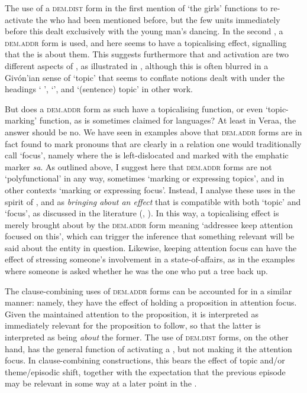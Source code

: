\documentclass[output=paper
,modfonts
,nonflat]{langsci/langscibook}
\begin{document}
\noindent
The use of a \textsc{dem.dist} form in the first mention of `the girls' functions to re-activate the  who had been mentioned before, but the few  units immediately before this dealt exclusively with the young man's dancing. In the second , a \textsc{dem.addr} form is used, and here seems to have a topicalising effect, signalling that the  is about them. This suggests furthermore that  and  activation are two different aspects of , as illustrated in \cite[Chapter~2]{Vallduvi1993} , although this is often blurred in a Giv\'{o}n'ian sense of `topic' that seems to conflate notions dealt with under the headings ` ', `', and `(sentence) topic' in other work.

But does a \textsc{dem.addr} form as such have a topicalising function, or even `topic-marking' function, as is sometimes claimed for  languages? At least in Vera{\textquotesingle}a, the answer should be no. We have seen in examples above that \textsc{dem.addr} forms are in fact found to mark pronouns that are clearly in a relation one would traditionally call `focus', namely where the  is left-dislocated and marked with the emphatic marker \textit{sa}. As outlined above, I suggest here that \textsc{dem.addr} forms are not `polyfunctional' in any way, sometimes `marking or expressing topics', and in other contexts `marking or expressing focus'. Instead, I analyse these uses in the spirit of \cite{MaticWedgwood2013}, \cite{Ozerov2014} and \cite{Ozerov2015} as \emph{bringing about an effect} that is compatible with both `topic' and `focus', as discussed in the literature (\citealt{Lambrecht1994}, \citealt{Krifka2008}). In this way, a topicalising effect is merely brought about by the \textsc{dem.addr} form meaning `addressee keep attention focused on this', which can trigger the inference that something relevant will be said about the entity in question. Likewise, keeping attention focus can have the effect of stressing someone's involvement in a state-of-affairs, as in the examples where someone is asked whether he was the one who put a tree back up.

The clause-combining uses of \textsc{dem.addr} forms can be accounted for in a similar manner: namely, they have the effect of holding a proposition in attention focus. Given the maintained attention to the proposition, it is interpreted as immediately relevant for the proposition to follow, so that the latter is interpreted as being \emph{about} the former. The use of \textsc{dem.dist} forms, on the other hand, has the general function of activating a , but not making it the attention focus. In clause-combining constructions, this bears the effect of topic and/or theme/episodic shift, together with the expectation that the previous episode may be relevant in some way at a later point in the .
\end{document}
